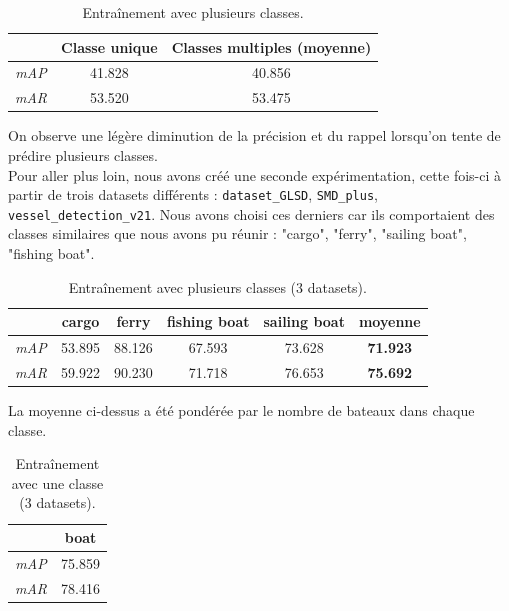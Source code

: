 \begin{table}[h]
    \begin{center}
        \begin{tabular}{c c c}
            \hline
            & Classe unique & Classes multiples (moyenne) \\
            \hline
            
            \textit{mAP} & 41.828 & 40.856 \\
            \textit{mAR} & 53.520 & 53.475 \\
            
        \end{tabular}
    \end{center}
    \caption{Entraînement avec plusieurs classes.}
\end{table}

On observe une légère diminution de la précision et du rappel lorsqu'on tente de prédire plusieurs
classes. \\

Pour aller plus loin, nous avons créé une seconde expérimentation, cette fois-ci à partir
de trois datasets différents : \texttt{dataset\_GLSD}, \texttt{SMD\_plus}, \texttt{vessel\_detection\_v21}.
Nous avons choisi ces derniers car ils comportaient des classes similaires que nous avons pu réunir :
"cargo", "ferry", "sailing boat", "fishing boat". \\

\begin{table}[H]
    \begin{center}
        \begin{tabular}{c c c c c c}
            \hline
            & cargo & ferry & fishing boat & sailing boat & \textbf{moyenne} \\
            \hline
            
            \textit{mAP} & 53.895 & 88.126 & 67.593 & 73.628 & \textbf{71.923}\\
            \textit{mAR} & 59.922 & 90.230 & 71.718 & 76.653 & \textbf{75.692}\\
        \end{tabular}
    \end{center}
    \caption{Entraînement avec plusieurs classes (3 datasets).}
\end{table}

La moyenne ci-dessus a été pondérée par le nombre de bateaux dans chaque classe. 

\begin{table}[H]
    \begin{center}
        \begin{tabular}{c c}
            \hline
            & boat  \\
            \hline

            \textit{mAP} & 75.859 \\
            \textit{mAR} & 78.416 \\
        \end{tabular}
    \end{center}
    \caption{Entraînement avec une classe (3 datasets).}
\end{table}

